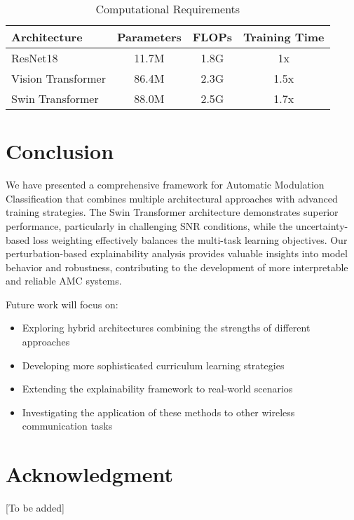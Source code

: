 \documentclass{ELSP}
\begin{document}
\begin{table}[h]
\caption{Computational Requirements}
\centering
\begin{tabular}{lccc}
\hline
\textbf{Architecture} & \textbf{Parameters} & \textbf{FLOPs} & \textbf{Training Time} \\
\hline
ResNet18 & 11.7M & 1.8G & 1x \\
Vision Transformer & 86.4M & 2.3G & 1.5x \\
Swin Transformer & 88.0M & 2.5G & 1.7x \\
\hline
\end{tabular}
\end{table}

\section{Conclusion}
We have presented a comprehensive framework for Automatic Modulation Classification that combines multiple architectural approaches with advanced training strategies. The Swin Transformer architecture demonstrates superior performance, particularly in challenging SNR conditions, while the uncertainty-based loss weighting effectively balances the multi-task learning objectives. Our perturbation-based explainability analysis provides valuable insights into model behavior and robustness, contributing to the development of more interpretable and reliable AMC systems.

Future work will focus on:
\begin{itemize}
    \item Exploring hybrid architectures combining the strengths of different approaches
    \item Developing more sophisticated curriculum learning strategies
    \item Extending the explainability framework to real-world scenarios
    \item Investigating the application of these methods to other wireless communication tasks
\end{itemize}

\section*{Acknowledgment}
[To be added]


 
\end{document}
